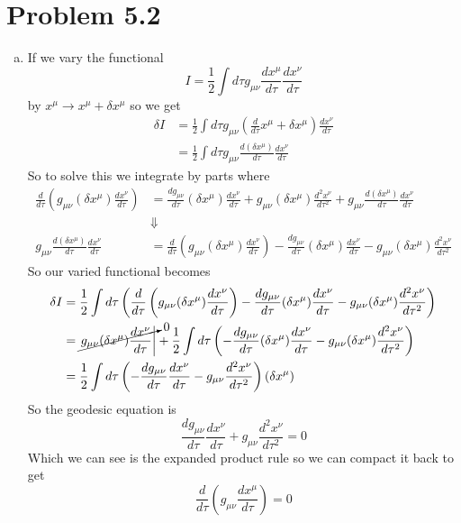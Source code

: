 \documentclass[11pt]{article}
\numberwithin{equation}{section}
\newcommand{\HWnum}{5}
\begin{document}
\section{Problem \HWnum.2}
\begin{enumerate}[(a)]
\item
If we vary the functional 
$$I = \frac{1}{2}\int d\tau g_{\mu\nu}\frac{dx^{\mu}}{d\tau}\frac{dx^{\nu}}{d\tau}$$
by $x^{\mu}\rightarrow x^{\mu}+\delta x^{\mu}$ so we get
\begin{align*}
\delta I &= \frac{1}{2}\int d\tau g_{\mu\nu}\left(\frac{d}{d\tau}x^{\mu}+\delta x^{\mu}\right)\frac{dx^{\nu}}{d\tau}\\
&= \frac{1}{2}\int d\tau g_{\mu\nu}\frac{d(\delta x^{\mu})}{d\tau}\frac{dx^{\nu}}{d\tau}
\end{align*}
So to solve this we integrate by parts where
\begin{align*}
\frac{d}{d\tau}\left(g_{\mu\nu}(\delta x^{\mu})\frac{dx^{\nu}}{d\tau}\right) &= \frac{dg_{\mu\nu}}{d\tau}(\delta x^{\mu})\frac{dx^{\nu}}{d\tau} + g_{\mu\nu}(\delta x^{\mu})\frac{d^2x^{\nu}}{d\tau^2} + g_{\mu\nu}\frac{d(\delta x^{\mu})}{d\tau}\frac{dx^{\nu}}{d\tau}\\
&\Downarrow\\
g_{\mu\nu}\frac{d(\delta x^{\mu})}{d\tau}\frac{dx^{\nu}}{d\tau} &= \frac{d}{d\tau}\left(g_{\mu\nu}(\delta x^{\mu})\frac{dx^{\nu}}{d\tau}\right) - \frac{dg_{\mu\nu}}{d\tau}(\delta x^{\mu})\frac{dx^{\nu}}{d\tau} - g_{\mu\nu}(\delta x^{\mu})\frac{d^2x^{\nu}}{d\tau^2}
\end{align*}
So our varied functional becomes
\begin{align*}
\delta I &= \frac{1}{2}\int d\tau\left(\frac{d}{d\tau}\left(g_{\mu\nu}(\delta x^{\mu})\frac{dx^{\nu}}{d\tau}\right) - \frac{dg_{\mu\nu}}{d\tau}(\delta x^{\mu})\frac{dx^{\nu}}{d\tau} - g_{\mu\nu}(\delta x^{\mu})\frac{d^2x^{\nu}}{d\tau^2} \right)\\
&= \cancelto{0}{\left.g_{\mu\nu}(\delta x^{\mu})\frac{dx^{\nu}}{d\tau}\right|} + \frac{1}{2}\int d\tau\left( - \frac{dg_{\mu\nu}}{d\tau}(\delta x^{\mu})\frac{dx^{\nu}}{d\tau} - g_{\mu\nu}(\delta x^{\mu})\frac{d^2x^{\nu}}{d\tau^2} \right)\\
&=  \frac{1}{2}\int d\tau\left( -\frac{dg_{\mu\nu}}{d\tau}\frac{dx^{\nu}}{d\tau} - g_{\mu\nu}\frac{d^2x^{\nu}}{d\tau^2} \right)(\delta x^{\mu})
\end{align*}
So the geodesic equation is
$$\frac{dg_{\mu\nu}}{d\tau}\frac{dx^{\nu}}{d\tau} + g_{\mu\nu}\frac{d^2x^{\nu}}{d\tau^2} = 0$$
Which we can see is the expanded product rule so we can compact it back to get
$$\frac{d}{d\tau}\left(g_{\mu\nu}\frac{dx^{\mu}}{d\tau}\right) = 0$$


\end{enumerate}
\end{document}
